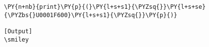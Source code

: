 \begin{Verbatim}[label=\makebox{\href{https://github.com/unipi-physics-labs/statnotes/tree/main/snippy/emoji.py}{https://github.com/.../emoji.py}},commandchars=\\\{\}]
\PY{n+nb}{print}\PY{p}{(}\PY{l+s+s1}{\PYZsq{}}\PY{l+s+se}{\PYZbs{}U0001F600}\PY{l+s+s1}{\PYZsq{}}\PY{p}{)}

[Output]
\smiley
\end{Verbatim}
